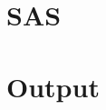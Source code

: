 \documentclass[letterpaper, 12pt]{article}
\begin{document}
\begin{appendices}
\section{SAS}
\section{Output}

\end{appendices}








\end{document}
